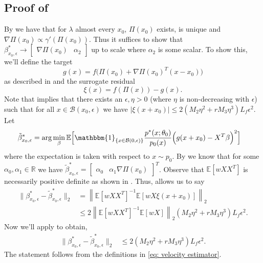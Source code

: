 \documentclass[11pt]{article}
\begin{document}
\subsection{Proof of } \label{sec: proof of population vel prop}
By  we have that for $\lambda$ almost every $x_0$, $\Pi(x_0)$ exists, is unique and $\nabla\Pi(x_0) \propto \gamma'(\Pi(x_0))$. Thus it suffices to show that $\beta^*_{x_0, \epsilon} \rightarrow  \begin{bmatrix} \nabla\Pi(x_0)  & \alpha_2\end{bmatrix}$ up to scale where $\alpha_2$ is some scalar. To show this, we'll define the  target  
\[g(x) = f\Big(\Pi(x_0) + \nabla\Pi(x_0)^{T}(x-x_0)\Big)\]
as described in  and the surrogate residual 
\[\xi(x) = f(\Pi(x)) - g(x).\] Note that  implies that there exists an $\epsilon, \eta > 0$ (where $\eta$ is non-decreasing with $\epsilon$) such that for all $x \in \mathcal{B}(x_0, \epsilon)$ we have $|\xi(x + x_0)| \le 2(M_2\eta^2+rM_3\eta^3)L_f\epsilon^2$. Let  
\begin{align}
    \tilde{\beta}^*_{x_0, \epsilon} &= \arg\min_{\beta}\mathbb{E}\Big[\mathbbm{1}_{\{x \in \mathcal{B}(0, \epsilon)\}}\frac{p^*(x;\theta_0)}{p_{0}(x)}\Big(g(x+x_0) - X^{T}\beta\Big)^2\Big] \label{eq: perturbed pop estimator}
\end{align}
where the expectation is taken with respect to $x \sim p_0$. By  we know that for some $\alpha_0, \alpha_1 \in \mathbb{R}$ we have $\tilde{\beta}^*_{x_0, \epsilon}  =  \begin{bmatrix}
    \alpha_0 & \alpha_1\nabla\Pi(x_0)
\end{bmatrix}^T$. Observe that $\mathbb{E}[wXX^{T}]$ is necessarily positive definite as shown in . Thus,  allows us to say 
\begin{align*} 
\|\beta^*_{x_0, \epsilon} - \tilde{\beta}_{x_0, \epsilon}^*\|_2 &= \left\|\mathbb{E}[wXX^{T}]^{-1}\mathbb{E}[wX\xi(x+x_0)]\right\|_2 \\
&\leq 2\left\|\mathbb{E}[wXX^{T}]^{-1}\mathbb{E}[wX]\right\|_2(M_2\eta^2+rM_3\eta^3)L_f\epsilon^2.
\end{align*}
Now we'll apply  to obtain,
\begin{align}
    \|\beta^*_{x_0, \epsilon} - \tilde{\beta}_{x_0, \epsilon}^*\|_2 &\le 2(M_2\eta^2+rM_3\eta^3)L_f\epsilon^2.
\end{align}
The statement follows from the definitions in \cref{eq: velocity estimator}. 
\end{document}

